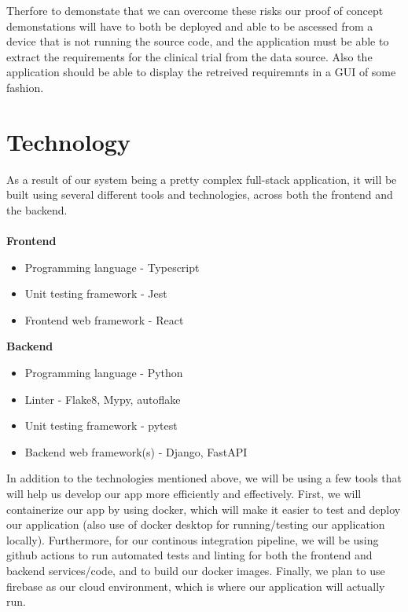 \documentclass{article}
\begin{document}
Therfore to demonstate that we can overcome these risks our proof of concept demonstations will have to both be deployed and able to be ascessed from a device that is not running the source code, and the application must be able to extract the requirements for the clinical trial from the data source. Also the application should be able to display the retreived requiremnts in a GUI of some fashion.

\section{Technology}

As a result of our system being a pretty complex full-stack application, it will be built
using several different tools and technologies, across both the frontend and the backend.
\\~\\
\textbf{Frontend}

\begin{itemize}
	\item Programming language - Typescript
	\item Unit testing framework - Jest
	\item Frontend web framework - React\\
\end{itemize}

\textbf{Backend}

\begin{itemize}
	\item Programming language - Python
	\item Linter - Flake8, Mypy, autoflake
	\item Unit testing framework - pytest
	\item Backend web framework(s) - Django, FastAPI\\
\end{itemize}

In addition to the technologies mentioned above, we will be using a few tools that will help us 
develop our app more efficiently and effectively. First, we will containerize our app
by using docker, which will make it easier to test and deploy our application (also use of docker desktop for running/testing
our application locally). Furthermore, for our continous 
integration pipeline, we will be using github actions to run automated tests and linting for both the frontend and backend 
services/code, and to build our docker images. Finally, we plan to use firebase as our cloud environment, which
is where our application will actually run. \\
\end{document}
